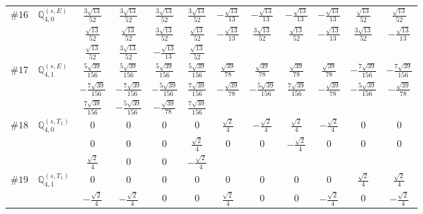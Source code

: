 \documentclass[fleqn,9pt,landscape]{jsarticle}
\begin{document}
\begin{center}
\begin{longtable}{lcccccccccc}
$ \#16\quad \mathbb{Q}_{4,0}^{(s,E)} $ & $ \frac{3 \sqrt{13}}{52} $ & $ \frac{3 \sqrt{13}}{52} $ & $ \frac{3 \sqrt{13}}{52} $ & $ \frac{3 \sqrt{13}}{52} $ & $ - \frac{\sqrt{13}}{13} $ & $ - \frac{\sqrt{13}}{13} $ & $ - \frac{\sqrt{13}}{13} $ & $ - \frac{\sqrt{13}}{13} $ & $ \frac{\sqrt{13}}{52} $ & $ \frac{\sqrt{13}}{52} $ \\
& $ \frac{\sqrt{13}}{52} $ & $ \frac{\sqrt{13}}{52} $ & $ \frac{3 \sqrt{13}}{52} $ & $ \frac{\sqrt{13}}{52} $ & $ - \frac{\sqrt{13}}{13} $ & $ \frac{3 \sqrt{13}}{52} $ & $ \frac{\sqrt{13}}{52} $ & $ - \frac{\sqrt{13}}{13} $ & $ \frac{3 \sqrt{13}}{52} $ & $ - \frac{\sqrt{13}}{13} $ \\
& $ \frac{\sqrt{13}}{52} $ & $ \frac{3 \sqrt{13}}{52} $ & $ - \frac{\sqrt{13}}{13} $ & $ \frac{\sqrt{13}}{52} $ & $  $ & $  $ & $  $ & $  $ & $  $ & $  $ \\ \hline
$ \#17\quad \mathbb{Q}_{4,1}^{(s,E)} $ & $ \frac{5 \sqrt{39}}{156} $ & $ \frac{5 \sqrt{39}}{156} $ & $ \frac{5 \sqrt{39}}{156} $ & $ \frac{5 \sqrt{39}}{156} $ & $ \frac{\sqrt{39}}{78} $ & $ \frac{\sqrt{39}}{78} $ & $ \frac{\sqrt{39}}{78} $ & $ \frac{\sqrt{39}}{78} $ & $ - \frac{7 \sqrt{39}}{156} $ & $ - \frac{7 \sqrt{39}}{156} $ \\
& $ - \frac{7 \sqrt{39}}{156} $ & $ - \frac{7 \sqrt{39}}{156} $ & $ - \frac{5 \sqrt{39}}{156} $ & $ \frac{7 \sqrt{39}}{156} $ & $ - \frac{\sqrt{39}}{78} $ & $ - \frac{5 \sqrt{39}}{156} $ & $ \frac{7 \sqrt{39}}{156} $ & $ - \frac{\sqrt{39}}{78} $ & $ - \frac{5 \sqrt{39}}{156} $ & $ - \frac{\sqrt{39}}{78} $ \\
& $ \frac{7 \sqrt{39}}{156} $ & $ - \frac{5 \sqrt{39}}{156} $ & $ - \frac{\sqrt{39}}{78} $ & $ \frac{7 \sqrt{39}}{156} $ & $  $ & $  $ & $  $ & $  $ & $  $ & $  $ \\ \hline
$ \#18\quad \mathbb{Q}_{4,0}^{(s,T_{1})} $ & $ 0 $ & $ 0 $ & $ 0 $ & $ 0 $ & $ \frac{\sqrt{2}}{4} $ & $ - \frac{\sqrt{2}}{4} $ & $ \frac{\sqrt{2}}{4} $ & $ - \frac{\sqrt{2}}{4} $ & $ 0 $ & $ 0 $ \\
& $ 0 $ & $ 0 $ & $ 0 $ & $ \frac{\sqrt{2}}{4} $ & $ 0 $ & $ 0 $ & $ - \frac{\sqrt{2}}{4} $ & $ 0 $ & $ 0 $ & $ 0 $ \\
& $ \frac{\sqrt{2}}{4} $ & $ 0 $ & $ 0 $ & $ - \frac{\sqrt{2}}{4} $ & $  $ & $  $ & $  $ & $  $ & $  $ & $  $ \\ \hline
$ \#19\quad \mathbb{Q}_{4,1}^{(s,T_{1})} $ & $ 0 $ & $ 0 $ & $ 0 $ & $ 0 $ & $ 0 $ & $ 0 $ & $ 0 $ & $ 0 $ & $ \frac{\sqrt{2}}{4} $ & $ \frac{\sqrt{2}}{4} $ \\
& $ - \frac{\sqrt{2}}{4} $ & $ - \frac{\sqrt{2}}{4} $ & $ 0 $ & $ 0 $ & $ \frac{\sqrt{2}}{4} $ & $ 0 $ & $ 0 $ & $ - \frac{\sqrt{2}}{4} $ & $ 0 $ & $ - \frac{\sqrt{2}}{4} $ \\

\end{longtable}
\end{center}
\end{document}
